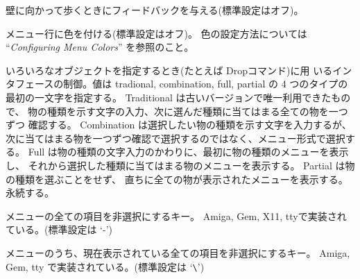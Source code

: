 壁に向かって歩くときにフィードバックを与える(標準設定はオフ)。
\item[\ib{menucolors}]
メニュー行に色を付ける(標準設定はオフ)。
色の設定方法については ``{\it Configuring Menu Colors\/}'' を参照のこと。
\item[\ib{menustyle}]
いろいろなオブジェクトを指定するとき(たとえば Dropコマンド)に用
いるインタフェースの制御。値は tradional, combination, full, partial
の 4 つのタイプの最初の一文字を指定する。
Traditional は古いバージョンで唯一利用できたもので、
物の種類を示す文字の入力、次に選んだ種類に当てはまる全ての物を一つずつ
確認する。
Combination は選択したい物の種類を示す文字を入力するが、
次に当てはまる物を一つずつ確認で選択するのではなく、メニュー形式で選択する。
Full は物の種類の文字入力のかわりに、最初に物の種類のメニューを表示し、
それから選択した種類に当てはまる物のメニューを表示する。
Partial は物の種類を選ぶことをせず、
直ちに全ての物が表示されたメニューを表示する。
永続する。
\item[\ib{menu\verb+_+deselect\verb+_+all}]
メニューの全ての項目を非選択にするキー。
Amiga, Gem, X11, ttyで実装されている。(標準設定は `-')
\item[\ib{menu\verb+_+deselect\verb+_+page}]
メニューのうち、現在表示されている全ての項目を非選択にするキー。
Amiga, Gem, tty で実装されている。(標準設定は `\verb+\+')
